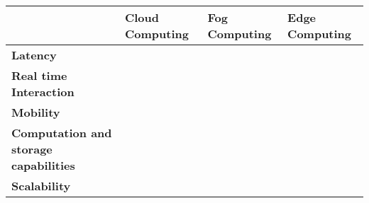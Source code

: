 \documentclass{standalone}
\begin{document}
	\centering
    \begin{tabular}{l l l l}
    \hline
    & \textbf{Cloud Computing} & \textbf{Fog Computing} & \textbf{Edge Computing}\\
    \hline
    \textbf{Latency}  & & & \\
    \textbf{Real time Interaction} & & & \\
    \textbf{Mobility} & & & \\
    \textbf{Computation and storage capabilities} & & & \\
    \textbf{Scalability} & & & \\
    
    
    \end{tabular}
\end{document}
